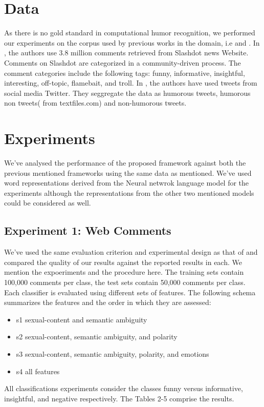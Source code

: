 \documentclass{acm_proc_article-sp}
\begin{document}
\section{Data}

As there is no gold standard in computational humor recognition, we performed our experiments on the corpus used by previous works in the domain, i.e \cite{reyes2010evaluating} and \cite{zhang2014recognizing}.  In \cite{reyes2010evaluating}, the authors use 3.8 million comments retrieved from Slashdot news Website.  Comments on Slashdot are categorized in a community-driven process. The comment categories include the following tags: funny, informative, insightful, interesting, off-topic, flamebait, and troll. In \cite{zhang2014recognizing}, the authors have used tweets from social media Twitter. They seggregate the data as humorous tweets, humorous non tweets( from textfiles.com) and non-humorous tweets. 


\section{Experiments}

We've analysed the performance of the proposed framework against both the previous mentioned frameworks using the same data as mentioned. We've used word representations derived from the Neural netwrok language model for the experiments although the representations from the other two mentioned models could be considered as well.

\subsection{Experiment 1: Web Comments}

We've used the same evaluation criterion and experimental design as that of \cite{reyes2010evaluating} and compared the quality of our results against the reported results in each. We mention the expoeriments and the procedure here.  The training sets contain 100,000 comments per class, the test sets contain 50,000 comments per class. Each classifier is evaluated using different sets of features.
The following schema summarizes the features and the order in which they are assessed: 

\begin{itemize} 
 
\item s1 sexual-content and semantic ambiguity
\item s2 sexual-content, semantic ambiguity, and polarity
\item s3 sexual-content, semantic ambiguity, polarity, and
emotions
\item s4 all features

\end{itemize}
All classifications experiments consider the classes funny
versus informative, insightful, and negative respectively.
The Tables 2-5 comprise the results.
\end{document}
